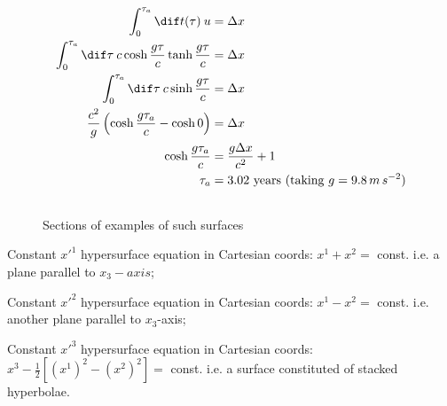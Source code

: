 \documentclass[12pt]{article}
\begin{document}
            \subsubsection{} \begin{align*}
                \int_0^{\tau_a} \dif t(\tau)\:  u &=  \Delta x\\
                \int_0^{\tau_a}\dif\tau\: c\cosh\frac{ g \tau}{c}\tanh \frac{ g \tau}{c} &=  \Delta x\\
                \int_0^{\tau_a} \dif \tau\:  c \sinh \frac{ g \tau}{c} &=  \Delta x\\
                \frac{c^2}{g}\left(\cosh \frac{g\tau_a}{c} -\cosh 0\right) &=  \Delta x\\
                \cosh \frac{g\tau_a}{c} &=  \frac{g\Delta x}{c^2} + 1\\
                \tau_a &=  3.02 \text{ years (taking }g=9.8\, m\, s^{-2} \text{)}
            \end{align*}
        \subsection{} 
        \begin{figure}[ht]
            \centering
            \def\svgwidth{300pt}
            \caption{Sections of examples of such surfaces}
        \end{figure}
        Constant $x'^1$ hypersurface equation in Cartesian coords: \(x^1 + x^2 = \) const. i.e. a plane parallel to $x_3-axis$;
        
        Constant $x'^2$ hypersurface equation in Cartesian coords: \(x^1 - x^2 = \) const. i.e. another plane parallel to $x_3$-axis;

        Constant $x'^3$ hypersurface equation in Cartesian coords: \(x^3 - \frac{1}{2}\left[(x^1)^2 - (x^2)^2 \right]= \) const. i.e. a surface constituted of stacked hyperbolae.

        
\end{document}
